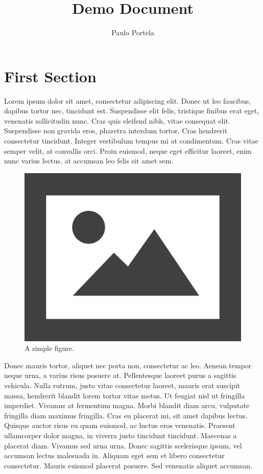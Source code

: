 \documentclass{article}
\begin{document}
	\title{Demo Document}  %
	\author{Paulo Portela}  %
	\maketitle  %
	\thispagestyle{empty}  %
	\newpage
	
	\setcounter{page}{1}  %
	
	\tableofcontents
	\newpage
	
	\listoffigures  %
	\newpage
	
	\listoftables  %
	\newpage
	
	\setcounter{page}{1}  %
	
	\section{First Section}
	
	Lorem ipsum dolor sit amet, consectetur adipiscing elit. Donec ut leo faucibus, dapibus tortor nec, tincidunt est. Suspendisse elit felis, tristique finibus erat eget, venenatis sollicitudin nunc. Cras quis eleifend nibh, vitae consequat elit. Suspendisse non gravida eros, pharetra interdum tortor. Cras hendrerit consectetur tincidunt. Integer vestibulum tempus mi at condimentum. Cras vitae semper velit, at convallis orci. Proin euismod, neque eget efficitur laoreet, enim nunc varius lectus, at accumsan leo felis sit amet sem.
	
	\begin{figure}[H]
		\centering
		\includegraphics[width=0.3\linewidth]{figures/fig1}
		\caption[Figure 1]{A simple figure.}
		\label{fig:fig1}
	\end{figure}
	
	Donec mauris tortor, aliquet nec porta non, consectetur ac leo. Aenean tempor neque urna, a varius risus posuere at. Pellentesque laoreet purus a sagittis vehicula. Nulla rutrum, justo vitae consectetur laoreet, mauris erat suscipit massa, hendrerit blandit lorem tortor vitae metus. Ut feugiat nisl ut fringilla imperdiet. Vivamus at fermentum magna. Morbi blandit diam arcu, vulputate fringilla diam maximus fringilla. Cras eu placerat mi, sit amet dapibus lectus. Quisque auctor risus eu quam euismod, ac luctus eros venenatis. Praesent ullamcorper dolor magna, in viverra justo tincidunt tincidunt. Maecenas a placerat diam. Vivamus sed urna urna. Donec sagittis scelerisque ipsum, vel accumsan lectus malesuada in. Aliquam eget sem et libero consectetur consectetur. Mauris euismod placerat posuere. Sed venenatis aliquet accumsan.
	
\end{document}
